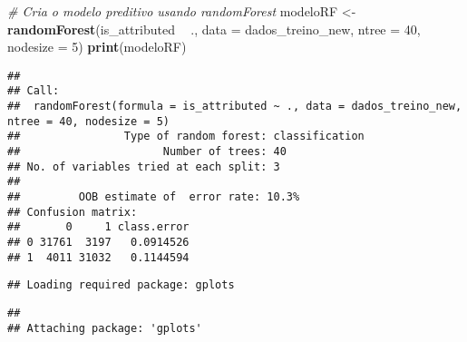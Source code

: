 \documentclass[]{article}
\newenvironment{Shaded}{\begin{snugshade}}{\end{snugshade}}
\newcommand{\CommentTok}[1]{\textcolor[rgb]{0.56,0.35,0.01}{\textit{#1}}}
\newcommand{\DataTypeTok}[1]{\textcolor[rgb]{0.13,0.29,0.53}{#1}}
\newcommand{\DecValTok}[1]{\textcolor[rgb]{0.00,0.00,0.81}{#1}}
\newcommand{\KeywordTok}[1]{\textcolor[rgb]{0.13,0.29,0.53}{\textbf{#1}}}
\newcommand{\NormalTok}[1]{#1}
\newcommand{\OperatorTok}[1]{\textcolor[rgb]{0.81,0.36,0.00}{\textbf{#1}}}
\newcommand{\StringTok}[1]{\textcolor[rgb]{0.31,0.60,0.02}{#1}}
\begin{document}
\begin{Shaded}
\begin{Highlighting}[]
\CommentTok{# Cria o modelo preditivo usando randomForest}
\NormalTok{modeloRF <-}\StringTok{ }\KeywordTok{randomForest}\NormalTok{(is_attributed }\OperatorTok{~}\StringTok{ }\NormalTok{., }
                         \DataTypeTok{data =}\NormalTok{ dados_treino_new,}
                         \DataTypeTok{ntree =} \DecValTok{40}\NormalTok{, }
                         \DataTypeTok{nodesize =} \DecValTok{5}\NormalTok{)}
\KeywordTok{print}\NormalTok{(modeloRF)}
\end{Highlighting}
\end{Shaded}

\begin{verbatim}
## 
## Call:
##  randomForest(formula = is_attributed ~ ., data = dados_treino_new,      ntree = 40, nodesize = 5) 
##                Type of random forest: classification
##                      Number of trees: 40
## No. of variables tried at each split: 3
## 
##         OOB estimate of  error rate: 10.3%
## Confusion matrix:
##       0     1 class.error
## 0 31761  3197   0.0914526
## 1  4011 31032   0.1144594
\end{verbatim}

\begin{Shaded}
\end{Shaded}

\begin{verbatim}
## Loading required package: gplots
\end{verbatim}

\begin{verbatim}
## 
## Attaching package: 'gplots'
\end{verbatim}
\end{document}
